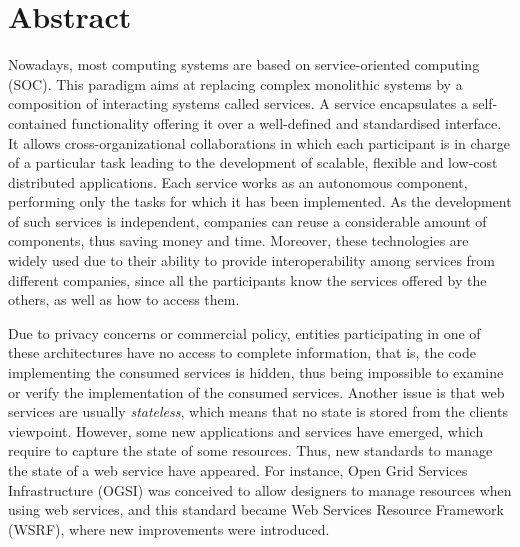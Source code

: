 \chapter*{Abstract}\label{c0}

Nowadays, most computing systems are based on service-oriented computing (SOC). 
This paradigm aims at replacing complex monolithic systems by a composition of interacting systems
called services. A service encapsulates a self-contained functionality offering it over
a well-defined and standardised interface. It allows cross-organizational collaborations 
in which each participant is in charge of a particular task leading to 
the development of scalable, flexible and low-cost distributed applications. Each service
works as an autonomous component, performing only the tasks for which it has been implemented. 
As the development of such services is independent, companies can reuse a considerable amount of components, 
thus saving money and time. Moreover, these technologies are widely used 
due to their ability to provide interoperability among services 
from different companies, since all the participants know the services offered by the others, as well as how to access them. 

Due to privacy concerns or commercial policy, entities participating in one of 
these architectures have no access to complete information, that is, 
the code implementing the consumed services is hidden, 
thus being impossible to examine or verify the implementation of the consumed services.
Another issue is that web services are usually \emph{stateless},
which means that no state is stored from the clients viewpoint. 
However, some new applications and services have emerged, which
require to capture the state of some resources. Thus,
new standards to manage the state of a web service have appeared. For instance,
Open Grid Services Infrastructure (OGSI) was conceived to allow designers to manage resources when using web services, and
this standard became Web Services Resource Framework (WSRF), where new improvements were introduced. 

